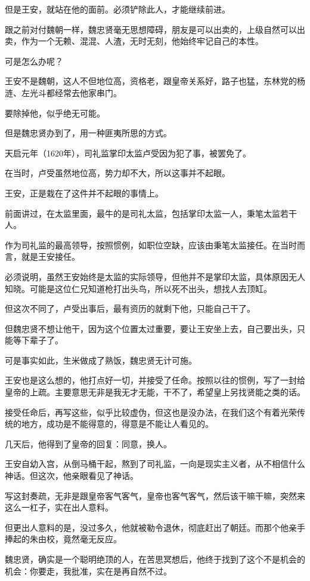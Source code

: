 \begin{multicols}{\theparacolNo}
		但是王安，就站在他的面前。必须铲除此人，才能继续前进。

		跟之前对付魏朝一样，魏忠贤毫无思想障碍，朋友是可以出卖的，上级自然可以出卖，作为一个无赖、混混、人渣，无时无刻，他始终牢记自己的本性。

		可是怎么办呢？

		王安不是魏朝，这人不但地位高，资格老，跟皇帝关系好，路子也猛，东林党的杨涟、左光斗都经常去他家串门。

		要除掉他，似乎绝无可能。

		但是魏忠贤办到了，用一种匪夷所思的方式。

		天启元年（1620年），司礼监掌印太监卢受因为犯了事，被罢免了。

		在当时，卢受虽然地位高，势力却不大，所以这事并不起眼。

		王安，正是栽在了这件并不起眼的事情上。

		前面讲过，在太监里面，最牛的是司礼太监，包括掌印太监一人，秉笔太监若干人。

		作为司礼监的最高领导，按照惯例，如职位空缺，应该由秉笔太监接任。在当时而言，就是王安接任。

		必须说明，虽然王安始终是太监的实际领导，但他并不是掌印太监，具体原因无人知晓。可能是这位仁兄知道枪打出头鸟，所以死不出头，想找人去顶缸。

		但这次不同了，卢受出事后，最有资历的就剩下他，只能自己干了。

		但魏忠贤不想让他干，因为这个位置太过重要，要让王安坐上去，自己要出头，只能等下辈子了。

		可是事实如此，生米做成了熟饭，魏忠贤无计可施。

		王安也是这么想的，他打点好一切，并接受了任命。按照以往的惯例，写了一封给皇帝的上疏。主要意思无非是我无才无能，干不了，希望皇上另找贤能之类的话。

		接受任命后，再写这些，似乎比较虚伪，但这也是没办法，在我们这个有着光荣传统的地方，成功是不能得意的，得意是不能让人看见的。

		几天后，他得到了皇帝的回复：同意，换人。

		王安自幼入宫，从倒马桶干起，熬到了司礼监，一向是现实主义者，从不相信什么神话。但这次，他亲眼看见了神话。

		写这封奏疏，无非是跟皇帝客气客气，皇帝也客气客气，然后该干嘛干嘛，突然来这么一杠子，实在出人意料。

		但更出人意料的是，没过多久，他就被勒令退休，彻底赶出了朝廷。而那个他亲手捧起的朱由校，竟然毫无反应。

		魏忠贤，确实是一个聪明绝顶的人，在苦思冥想后，他终于找到了这个不是机会的机会：你要走，我批准，实在是再自然不过。


\end{multicols}
